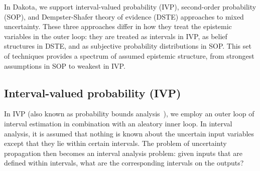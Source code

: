 In Dakota, we support interval-valued probability (IVP), second-order
probability (SOP), and Dempster-Shafer theory of evidence (DSTE)
approaches to mixed uncertainty. These three approaches differ in how
they treat the epistemic variables in the outer loop: they are treated
as intervals in IVP, as belief structures in DSTE, and as subjective
probability distributions in SOP. This set of techniques provides a
spectrum of assumed epistemic structure, from strongest assumptions in
SOP to weakest in IVP.

\subsection{Interval-valued probability (IVP)} \label{adv_models:mixed_uq:ivp}

In IVP (also known as probability bounds
analysis~\cite{Fer06,KaKiVeAj09,Aug07}), we employ an outer loop
of interval estimation in combination with an aleatory inner loop.
In interval analysis, it is assumed that nothing is known
about the uncertain input variables except that they lie within
certain intervals. The problem of uncertainty propagation then
becomes an interval analysis problem: given inputs that are defined
within intervals, what are the corresponding intervals on the outputs?


